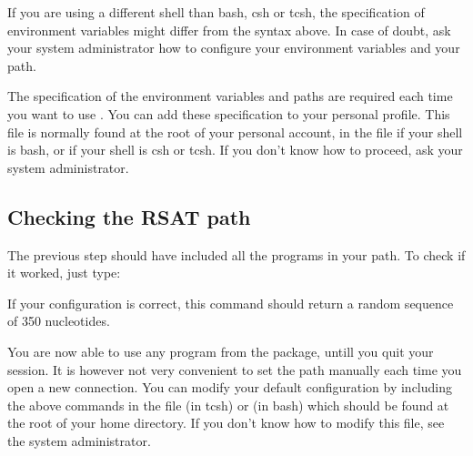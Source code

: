 If you are using a different shell than bash, csh or tcsh, the
specification of environment variables might differ from the syntax
above.  In case of doubt, ask your system administrator how to
configure your environment variables and your path.

The specification of the environment variables and paths are required
each time you want to use \RSAT. You can add these specification to
your personal profile.  This file is normally found at the root of
your personal account, in the file  if your shell is
bash, or  if your shell is csh or tcsh. If you don't know
how to proceed, ask your system administrator.



\subsection{Checking the RSAT path}

 The previous step should have included all the \RSAT programs in
your path.  To check if it worked, just type:


If your configuration is correct, this command should return a random
sequence of 350 nucleotides.

You are now able to use any program from the \RSAT package, untill you
quit your session. It is however not very convenient to set the path
manually each time you open a new connection. You can modify your
default configuration by including the above commands in the file
 (in tcsh) or  (in bash) which should be
found at the root of your home directory. If you don't know how to
modify this file, see the system administrator.

